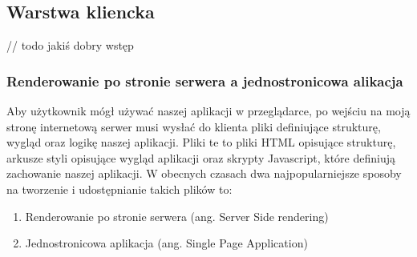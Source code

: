 \subsection{Warstwa kliencka}
// todo jakiś dobry wstęp
\subsubsection{Renderowanie po stronie serwera a jednostronicowa alikacja}
Aby użytkownik mógł używać naszej aplikacji w przeglądarce, po wejściu na moją stronę internetową serwer musi wysłać do klienta pliki definiujące strukturę, wygląd oraz logikę naszej aplikacji. Pliki te to pliki HTML opisujące strukturę, arkusze styli opisujące wygląd aplikacji oraz skrypty Javascript, które definiują zachowanie naszej aplikacji.
W obecnych czasach dwa najpopularniejsze sposoby na tworzenie i udostępnianie takich plików to:
\begin{enumerate}
  \item Renderowanie po stronie serwera (ang. Server Side rendering)
  \item Jednostronicowa aplikacja (ang. Single Page Application)
\end{enumerate}

